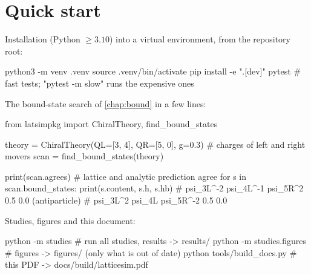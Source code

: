 \section{Quick start}
Installation (Python $\geq 3.10$) into a virtual environment, from the repository root:
\begin{shell}
python3 -m venv .venv
source .venv/bin/activate
pip install -e ".[dev]"
pytest                      # fast tests; "pytest -m slow" runs the expensive ones
\end{shell}
The bound-state search of \cref{chap:bound} in a few lines:
\begin{python}
from latsimpkg import ChiralTheory, find_bound_states

theory = ChiralTheory(QL=[3, 4], QR=[5, 0], g=0.3)   # charges of left and right movers
scan = find_bound_states(theory)

print(scan.agrees)                 # lattice and analytic prediction agree
for s in scan.bound_states:
    print(s.content, s.h, s.hb)    # psi_3L^-2 psi_4L^-1 psi_5R^2   0.5  0.0  (antiparticle)
                                   # psi_3L^2 psi_4L psi_5R^-2      0.5  0.0
\end{python}
Studies, figures and this document:
\begin{shell}
python -m studies               # run all studies, results -> results/
python -m studies.figures       # figures -> figures/ (only what is out of date)
python tools/build_docs.py      # this PDF -> docs/build/latticesim.pdf
\end{shell}

